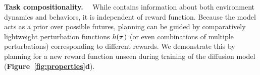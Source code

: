 \vspace{.2em}
\textbf{Task compositionality.}~~
While \method contains information about both environment dynamics and behaviors, it is independent of reward function.
Because the model acts as a prior over possible futures, planning can be guided by comparatively lightweight perturbation functions $h(\bm{\tau}^{})$ (or even combinations of multiple perturbations) corresponding to different rewards.
We demonstrate this by planning for a new reward function unseen during training of the diffusion model (\textbf{Figure~\ref{fig:properties}d}).


